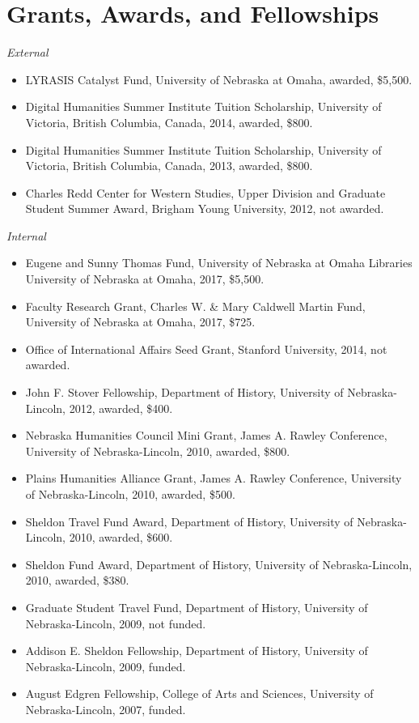 \section{Grants, Awards, and
Fellowships}\label{grants-awards-and-fellowships}

\emph{External}

\begin{itemize}
\tightlist
\item
  LYRASIS Catalyst Fund, University of Nebraska at Omaha, awarded,
  \$5,500.
\item
  Digital Humanities Summer Institute Tuition Scholarship, University of
  Victoria, British Columbia, Canada, 2014, awarded, \$800.
\item
  Digital Humanities Summer Institute Tuition Scholarship, University of
  Victoria, British Columbia, Canada, 2013, awarded, \$800.
\item
  Charles Redd Center for Western Studies, Upper Division and Graduate
  Student Summer Award, Brigham Young University, 2012, not awarded.
\end{itemize}

\emph{Internal}

\begin{itemize}
\tightlist
\item
  Eugene and Sunny Thomas Fund, University of Nebraska at Omaha
  Libraries University of Nebraska at Omaha, 2017, \$5,500.
\item
  Faculty Research Grant, Charles W. \& Mary Caldwell Martin Fund,
  University of Nebraska at Omaha, 2017, \$725.
\item
  Office of International Affairs Seed Grant, Stanford University, 2014,
  not awarded.
\item
  John F. Stover Fellowship, Department of History, University of
  Nebraska-Lincoln, 2012, awarded, \$400.
\item
  Nebraska Humanities Council Mini Grant, James A. Rawley Conference,
  University of Nebraska-Lincoln, 2010, awarded, \$800.
\item
  Plains Humanities Alliance Grant, James A. Rawley Conference,
  University of Nebraska-Lincoln, 2010, awarded, \$500.
\item
  Sheldon Travel Fund Award, Department of History, University of
  Nebraska-Lincoln, 2010, awarded, \$600.
\item
  Sheldon Fund Award, Department of History, University of
  Nebraska-Lincoln, 2010, awarded, \$380.
\item
  Graduate Student Travel Fund, Department of History, University of
  Nebraska-Lincoln, 2009, not funded.
\item
  Addison E. Sheldon Fellowship, Department of History, University of
  Nebraska-Lincoln, 2009, funded.
\item
  August Edgren Fellowship, College of Arts and Sciences, University of
  Nebraska-Lincoln, 2007, funded.
\end{itemize}

